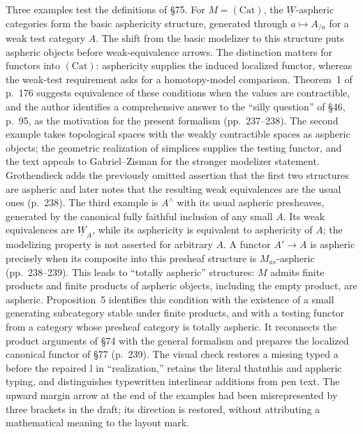 \documentclass[10pt,oneside]{book}
\begin{document}
Three examples test the definitions of \S75. For $M=(\mathrm{Cat})$, the $\underline W$-aspheric categories form the basic asphericity structure, generated through $a\mapsto A_{/a}$ for a weak test category $A$. The shift from the basic modelizer to this structure puts aspheric objects before weak-equivalence arrows. The distinction matters for functors into $(\mathrm{Cat})$: asphericity supplies the induced localized functor, whereas the weak-test requirement asks for a homotopy-model comparison. Theorem~1 of p.\ 176 suggests equivalence of these conditions when the values are contractible, and the author identifies a comprehensive answer to the “silly question” of \S46, p.\ 95, as the motivation for the present formalism (pp.\ 237--238). The second example takes topological spaces with the weakly contractible spaces as aspheric objects; the geometric realization of simplices supplies the testing functor, and the text appeals to Gabriel--Zisman for the stronger modelizer statement. Grothendieck adds the previously omitted assertion that the first two structures are aspheric and later notes that the resulting weak equivalences are the usual ones (p.\ 238). The third example is $A^\wedge$ with its usual aspheric presheaves, generated by the canonical fully faithful inclusion of any small $A$. Its weak equivalences are $\underline W_A$, while its asphericity is equivalent to asphericity of $A$; the modelizing property is not asserted for arbitrary $A$. A functor $A'\to A$ is aspheric precisely when its composite into this presheaf structure is $M_{as}$-aspheric (pp.\ 238--239). This leads to “totally aspheric” structures: $M$ admits finite products and finite products of aspheric objects, including the empty product, are aspheric. Proposition~5 identifies this condition with the existence of a small generating subcategory stable under finite products, and with a testing functor from a category whose presheaf category is totally aspheric. It reconnects the product arguments of \S74 with the general formalism and prepares the localized canonical functor of \S77 (p.\ 239). The visual check restores a missing typed a before the repaired l in “realization,” retains the literal thatnthis and appheric typing, and distinguishes typewritten interlinear additions from pen text. The upward margin arrow at the end of the examples had been misrepresented by three brackets in the draft; its direction is restored, without attributing a mathematical meaning to the layout mark.
\end{document}
